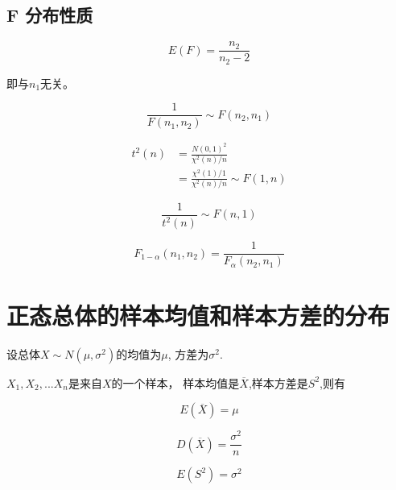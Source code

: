 \subsection{F 分布性质}

\begin{corollary}[F 分布数学期望]
    \begin{equation}
        E(F) =\frac{{ n_2} }{{ n_2}  - 2}
    \end{equation}

    即与$n_1$无关。
\end{corollary}

\begin{corollary}[$F(n_1,n_2),F(n_2,n_1)$的关系]
    \begin{equation}
        \frac{1}{F(n_1,n_2)} \sim F(n_2,n_1)
    \end{equation}
\end{corollary}

\begin{corollary}[与 t 分布的关系]
    \begin{equation}
        \begin{aligned}
            t^2(n) & = \frac{N(0,1)^2}{\chi^2 (n)/n}                    \\
                   & = \frac{\chi ^2(1)/1}{ \chi ^2(n) / n} \sim F(1,n)
        \end{aligned}
    \end{equation}

    \begin{equation}
        \frac{1}{t^2(n)} \sim F(n,1)
    \end{equation}
\end{corollary}

\begin{corollary}
    \begin{equation}
        F_{1-\alpha} (n_1,n_2) = \frac{1}{F_\alpha(n_2,n_1)}
    \end{equation}
\end{corollary}

\section{正态总体的样本均值和样本方差的分布}

\begin{definition}
    设总体$X\sim N(\mu,\sigma^2)$的均值为$\mu$, 方差为$σ^2$.

    $X_1,X_2,...X_n$是来自$X$的一个样本， 样本均值是$\overline{X}$,样本方差是$S^2$,则有

    \begin{equation}
        E(\overline{X}) = { \mu}
    \end{equation}

    \begin{equation}
        D(\overline{ X}) =  {\frac{\sigma^2}{n}}
    \end{equation}

    \begin{equation}
        E(S^2) = { \sigma^2}
    \end{equation}
\end{definition}

